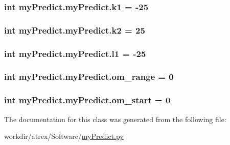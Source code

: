 \hypertarget{classmy_predict_1_1my_predict_a36f7425581e5d92e7ae40a14c731cc9c}{
\subsubsection[{k1}]{\setlength{\rightskip}{0pt plus 5cm}int my\-Predict.\-my\-Predict.\-k1 = -\/25\hspace{0.3cm}{\ttfamily [static]}}}\label{classmy_predict_1_1my_predict_a36f7425581e5d92e7ae40a14c731cc9c}
\hypertarget{classmy_predict_1_1my_predict_a25decbee9aa99c6106854776fdeca4bb}{
\subsubsection[{k2}]{\setlength{\rightskip}{0pt plus 5cm}int my\-Predict.\-my\-Predict.\-k2 = 25\hspace{0.3cm}{\ttfamily [static]}}}\label{classmy_predict_1_1my_predict_a25decbee9aa99c6106854776fdeca4bb}
\hypertarget{classmy_predict_1_1my_predict_a6b9c00f63edbf64fb570418b1f1a6905}{
\subsubsection[{l1}]{\setlength{\rightskip}{0pt plus 5cm}int my\-Predict.\-my\-Predict.\-l1 = -\/25\hspace{0.3cm}{\ttfamily [static]}}}\label{classmy_predict_1_1my_predict_a6b9c00f63edbf64fb570418b1f1a6905}
\hypertarget{classmy_predict_1_1my_predict_a4b21c39ba945630d9b575427e578ca96}{
\subsubsection[{om\-\_\-range}]{\setlength{\rightskip}{0pt plus 5cm}int my\-Predict.\-my\-Predict.\-om\-\_\-range = 0\hspace{0.3cm}{\ttfamily [static]}}}\label{classmy_predict_1_1my_predict_a4b21c39ba945630d9b575427e578ca96}
\hypertarget{classmy_predict_1_1my_predict_a22120f9618f06acd8650c15c08825c80}{
\subsubsection[{om\-\_\-start}]{\setlength{\rightskip}{0pt plus 5cm}int my\-Predict.\-my\-Predict.\-om\-\_\-start = 0\hspace{0.3cm}{\ttfamily [static]}}}\label{classmy_predict_1_1my_predict_a22120f9618f06acd8650c15c08825c80}


The documentation for this class was generated from the following file\-:\begin{DoxyCompactItemize}
\item 
workdir/atrex/\-Software/\hyperlink{my_predict_8py}{my\-Predict.\-py}\end{DoxyCompactItemize}
